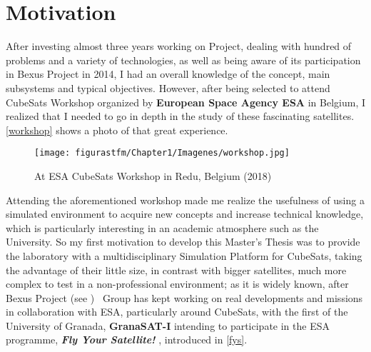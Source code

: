 \section{Motivation}\label{sec:mot}



After investing almost three years working on  Project, dealing with hundred of problems and a variety of technologies, as well as being aware of its participation in Bexus Project \cite{gsatbexus} in 2014, I had an overall knowledge of the  concept, main subsystems and typical objectives. However, after being selected to attend CubeSats Workshop organized by \textbf{European Space Agency \acrshort{ESA}} in Belgium, I realized that I needed to go in depth in the study of these fascinating satellites. \autoref{workshop} shows a photo of that great experience.

\begin{figure}
\centering
\texttt{[image: figurastfm/Chapter1/Imagenes/workshop.jpg]}
\caption{At \acrshort{ESA} CubeSats Workshop in Redu, Belgium (2018)}
\label{workshop}
\end{figure}


Attending the aforementioned workshop made me realize the usefulness of using a simulated environment to acquire new concepts and increase technical knowledge, which is particularly interesting in an academic atmosphere such as the University. So my first motivation to develop this Master's Thesis was to provide the  laboratory with a multidisciplinary Simulation Platform for CubeSats, taking the advantage of their little size, in contrast with bigger satellites, much more complex to test in a non-professional environment; as it is widely known, after Bexus Project (see \cite{gsatbexus}) ~Group has kept working on real developments and missions in collaboration with \acrshort{ESA}, particularly around CubeSats, with the first  of the University of Granada, \textbf{GranaSAT-I} intending to participate in the \acrshort{ESA} programme, \textbf{\textit{Fly Your Satellite!}} \cite{flyyour}, introduced in \autoref{fys}.

